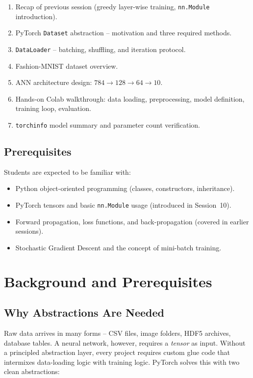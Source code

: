 \documentclass[12pt,a4paper]{article}
\begin{document}
\begin{enumerate}[label=\arabic*.]
  \item Recap of previous session (greedy layer-wise training, \texttt{nn.Module} introduction).
  \item PyTorch \texttt{Dataset} abstraction -- motivation and three required methods.
  \item \texttt{DataLoader} -- batching, shuffling, and iteration protocol.
  \item Fashion-MNIST dataset overview.
  \item ANN architecture design: $784 \to 128 \to 64 \to 10$.
  \item Hands-on Colab walkthrough: data loading, preprocessing, model definition, training loop, evaluation.
  \item \texttt{torchinfo} model summary and parameter count verification.
\end{enumerate}

\subsection{Prerequisites}

Students are expected to be familiar with:
\begin{itemize}
  \item Python object-oriented programming (classes, constructors, inheritance).
  \item PyTorch tensors and basic \texttt{nn.Module} usage (introduced in Session~10).
  \item Forward propagation, loss functions, and back-propagation (covered in earlier sessions).
  \item Stochastic Gradient Descent and the concept of mini-batch training.
\end{itemize}

\section{Background and Prerequisites}
\label{sec:background}

\subsection{Why Abstractions Are Needed}

Raw data arrives in many forms -- CSV files, image folders, HDF5 archives,
database tables.  A neural network, however, requires a \emph{tensor} as
input.  Without a principled abstraction layer, every project requires custom
glue code that intermixes data-loading logic with training logic.  PyTorch
solves this with two clean abstractions:
\end{document}
